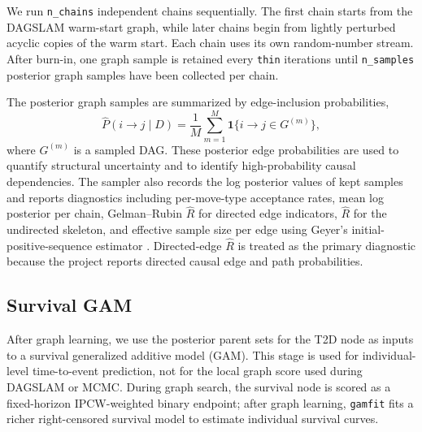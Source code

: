 \documentclass[11pt]{article}
\begin{document}
We run \texttt{n\_chains} independent chains sequentially. The first chain starts from the DAGSLAM warm-start graph, while later chains begin from lightly perturbed acyclic copies of the warm start. Each chain uses its own random-number stream. After burn-in, one graph sample is retained every \texttt{thin} iterations until \texttt{n\_samples} posterior graph samples have been collected per chain.

The posterior graph samples are summarized by edge-inclusion probabilities,
\[
\hat{P}(i \to j \mid D)
=
\frac{1}{M}\sum_{m=1}^M \mathbf{1}\{i \to j \in G^{(m)}\},
\]
where $G^{(m)}$ is a sampled DAG. These posterior edge probabilities are used to quantify structural uncertainty and to identify high-probability causal dependencies. The sampler also records the log posterior values of kept samples and reports diagnostics including per-move-type acceptance rates, mean log posterior per chain, Gelman--Rubin $\hat{R}$ for directed edge indicators, $\hat{R}$ for the undirected skeleton, and effective sample size per edge using Geyer's initial-positive-sequence estimator \citep{Geyer1992}. Directed-edge $\hat{R}$ is treated as the primary diagnostic because the project reports directed causal edge and path probabilities.


\subsection{Survival GAM}
After graph learning, we use the posterior parent sets for the T2D node as inputs to a survival generalized additive model (GAM). This stage is used for individual-level time-to-event prediction, not for the local graph score used during DAGSLAM or MCMC. During graph search, the survival node is scored as a fixed-horizon IPCW-weighted binary endpoint; after graph learning, \texttt{gamfit} fits a richer right-censored survival model to estimate individual survival curves.
\end{document}
